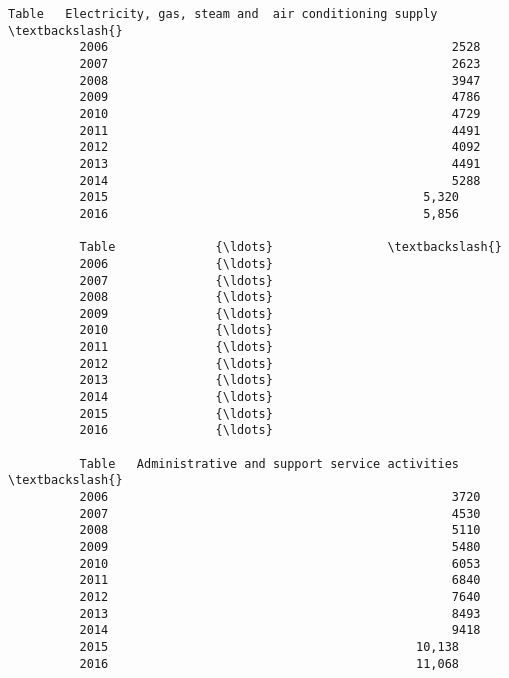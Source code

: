 \documentclass[11pt]{article}
\begin{document}
\begin{Verbatim}[commandchars=\\\{\}]
          Table   Electricity, gas, steam and  air conditioning supply  \textbackslash{}
          2006                                                2528       
          2007                                                2623       
          2008                                                3947       
          2009                                                4786       
          2010                                                4729       
          2011                                                4491       
          2012                                                4092       
          2013                                                4491       
          2014                                                5288       
          2015                                            5,320          
          2016                                            5,856          
          
          Table              {\ldots}                \textbackslash{}
          2006               {\ldots}                 
          2007               {\ldots}                 
          2008               {\ldots}                 
          2009               {\ldots}                 
          2010               {\ldots}                 
          2011               {\ldots}                 
          2012               {\ldots}                 
          2013               {\ldots}                 
          2014               {\ldots}                 
          2015               {\ldots}                 
          2016               {\ldots}                 
          
          Table   Administrative and support service activities                                                    \textbackslash{}
          2006                                                3720                                                  
          2007                                                4530                                                  
          2008                                                5110                                                  
          2009                                                5480                                                  
          2010                                                6053                                                  
          2011                                                6840                                                  
          2012                                                7640                                                  
          2013                                                8493                                                  
          2014                                                9418                                                  
          2015                                           10,138                                                     
          2016                                           11,068                                                     
          

\end{Verbatim}
\end{document}
